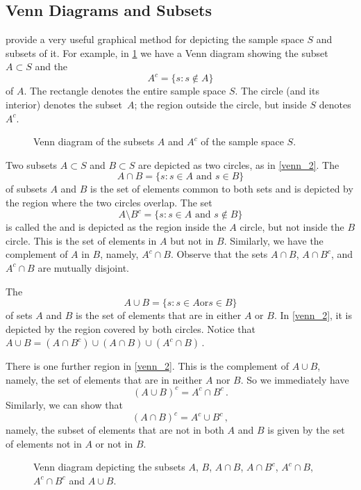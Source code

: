 \subsection{Venn Diagrams and Subsets}
 provide a very useful graphical method for depicting the sample space $S$ and subsets of it. For
example, in \ref{venn_1} we have a Venn diagram showing the subset $A \subset S$ and the 
$$
A^c = \{s:s\notin A\}
$$
of $A$. The rectangle denotes the entire sample space $S$. The circle (and its interior) denotes the subset~$A$; the
region outside the circle, but inside $S$ denotes $A^c$.
\begin{figure}[hb]
\caption{Venn diagram of the subsets $A$ and $A^c$ of the sample space $S$.}\label{venn_1}
\end{figure}

Two subsets $A \subset S$ and $B \subset S$ are depicted as two circles, as in \autoref{venn_2}. The
$$
A \cap B = \{s:s \in A \text{ and } s \in B\}
$$
of subsets $A$ and $B$ is the set of elements  common to both sets and is depicted by the region where the two
circles overlap. The set
$$
A \setminus B^c = \{s:s\in A \text{ and } s \notin B\}
$$
is called the  and is depicted as the region inside the $A$ circle, but not
inside the $B$ circle. This is the set of elements in   $A$ but not in $B$. Similarly, we have the complement of $A$
in $B$, namely, $A^c \cap B$. Observe that the sets $A\cap B$, $A \cap B^c$, and $A^c \cap B$ are mutually disjoint.

The 
$$
A \cup B = \{ s : s \in A \text{or} s \in B\}
$$
of sets $A$ and $B$ is the set of elements that are in either $A$ or $B$. In \autoref{venn_2}, it is depicted by the
region covered by both circles. Notice that $ A \cup B = \left(A \cap B^c\right) \cup (A \cap B) \cup (A^c \cap B)$\,.


There is one further region in \autoref{venn_2}. This is the complement of $A \cup B$, namely, the set of elements
that
are in neither $A$ nor $B$. So we immediately have
$$
    (A\cup B)^c = A^c \cap B^c\,.
$$
Similarly, we can show that
$$
    (A\cap B)^c = A^c \cup B^c
    \,,
$$
namely, the subset of elements that are not in both $A$ and $B$ is given by the set of elements not in $A$ or not in
$B$.
\begin{figure}[hb]
    \caption{Venn diagram depicting the subsets $A$, $B$, $A\cap B$, $A\cap B^c$, $A^c \cap B$, $A^c \cap B^c$ and $A
    \cup B$.}\label{venn_2}
\end{figure}


